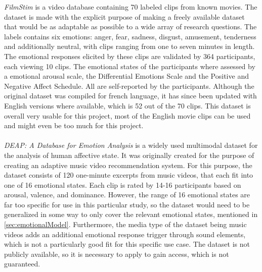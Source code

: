 \textit{FilmStim} is a video database containing 70 labeled clips from known movies. The dataset is made with the explicit purpose of making a freely available dataset that would be as adaptable as possible to a wide array of research questions. The labels contains six emotions: anger, fear, sadness, disgust, amusement, tenderness and additionally neutral, with clips ranging from one to seven minutes in length. The emotional responses elicited by these clips are validated by 364 participants, each viewing 10 clips. The emotional states of the participants where assessed by a emotional arousal scale, the Differential Emotions Scale and  the Positive and Negative Affect Schedule. All are self-reported by the participants. \cite{FilmStim}\newline
Although the original dataset was compiled for french language, it has since been updated with English versions where available, which is 52 out of the 70 clips. This dataset is overall very usable for this project, most of the English movie clips can be used and might even be too much for this project. \\\\
\textit{DEAP: A Database for Emotion Analysis} is a widely used multimodal dataset for the analysis of human affective state. It was originally created for the purpose of creating an adaptive music video recommendation system. For this purpose, the dataset consists of 120 one-minute excerpts from music videos, that each fit into one of 16 emotional states. Each clip is rated by 14-16 participants based on arousal, valence, and dominance. However, the range of 16 emotional states are far too specific for use in this particular study, so the dataset would need to be generalized in some way to only cover the relevant emotional states, mentioned in \cref{sec:emotionalModel}.
Furthermore, the media type of the dataset being music videos adds an additional emotional response trigger through sound elements, which is not a particularly good fit for this specific use case. The dataset is not publicly available, so it is necessary to apply to gain access, which is not guaranteed. \cite{DEAP} \newline

